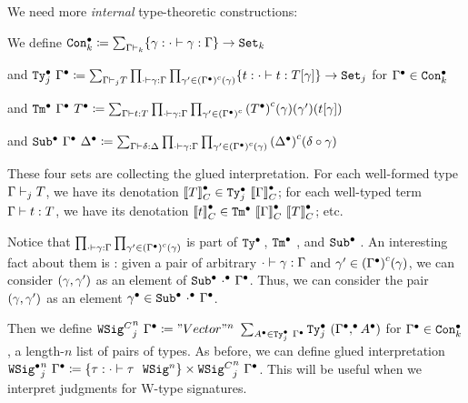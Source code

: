 \newcommand{\GTy}[2]{\ensuremath{\Glued{\texttt{Ty}}_{#1}~{#2}}}
\newcommand{\GCon}[1]{\ensuremath{\Glued{\texttt{Con}}_{#1}}}
\newcommand{\GTm}[2]{\ensuremath{\Glued{\texttt{Tm}}~{#1}~{#2}}}
\newcommand{\GSub}[2]{\ensuremath{\Glued{\texttt{Sub}}~{#1}~{#2}}}
\newcommand{\GMWSig}[3]{\ensuremath{{\texttt{WSig}^C}_{#1}^{#3}~{#2}}}
\newcommand{\GWSig}[3]{\ensuremath{{\Glued{\texttt{WSig}}}_{#1}^{#3}~{#2}}}


We need more \emph{internal} type-theoretic constructions:

We define $\GCon{k} \coloneq \sum_{\goodCtx{\Gm}{k}} \{\gm : \goodSub{\cdot}{\gm}{\Gm} \} \to \Set{k}$ 


and $\GTy{j}{\Glued{\Gm}} \coloneq \sum_{\goodType{\Gm}{T}{j}} \prod_{\goodSub{\cdot}{\gm}{\Gm}}\prod_{\gm' \in \Gmodel{\Glued{\Gm}}(\gm)}\{t : \goodTerm{\cdot}{t}{\sub{T}{\gm}}\}\to\Set{j} $ for $\Glued{\Gm} \in \GCon{k}$

and $\GTm{\Glued{\Gm}}{\Glued{T}} \coloneq \sum_{\goodTerm{\Gm}{t}{T}} \prod_{\goodSub{\cdot}{\gm}{\Gm}} \prod_{\gm' \in\Gmodel{\Glued{\Gm}}} \Gmodel{\Glued{T}}(\gm)(\gm')(\sub{t}{\gm})$

and $\GSub{\Glued{\Gm}}{\Glued{\Dl}} \coloneq \sum_{\goodSub{\Gm}{\delta}{\Dl}} \prod_{\goodSub{\cdot}{\gm}{\Gm}} \prod_{\gm' \in \Gmodel{\Glued{\Gm}}(\gm)} \Gmodel{\Glued{\Dl}}(\delta \circ \gm) $

These four sets are collecting the glued interpretation.
For each well-formed type $\goodType{\Gm}{T}{j}$, we have its denotation $\denotesCC{T} \in \GTy{j}{\denotesCC{\Gm}}$;
for each well-typed term $\goodTerm{\Gm}{t}{T}$, we have its denotation $\denotesCC{t} \in \GTm{\denotesCC{\Gm}}{\denotesCC{T}}$;
etc.


Notice that
$\prod_{\goodSub{\cdot}{\gm}{\Gm}} \prod_{\gm' \in \Gmodel{\Glued{\Gm}}(\gm)}$
is part of $\GTy{\!}{\!}$, $\GTm{\!}{\!}$, and $\GSub{\!}{\!}$.
An interesting fact about them is : given a pair of arbitrary $\goodSub{\cdot}{\gm}{\Gm}$
and $\gm' \in \Gmodel{\Glued{\Gm}}(\gm)$, we can consider $(\gm, \gm')$ as an
element of $\GSub{\Glued{\cdot}}{\Glued{\Gm}}$.
Thus, we can consider the pair $(\gm,
\gm')$ as an element $\Glued{\gm} \in \GSub{\Glued{\cdot}}{\Glued{\Gm}}$.


Then we define $\GMWSig{j}{\Glued{\Gm}}{n} \coloneq "Vector"^n~\sum_{\Glued{A}
\in \GTy{j}{\Glued{\Gm}}} \GTy{j}{(\GSubstExt{\Glued{\Gm}}{\Glued{A}})}$ for
$\Glued{\Gm} \in \GCon{k}$, a length-$n$ list of pairs of types.
As before, we can define glued interpretation $\GWSig{j}{\Glued{\Gm}}{n}
\coloneq \{ \wsig : \goodWSig{\cdot}{\wsig}{n} \} \times
\GMWSig{j}{\Glued{\Gm}}{n}$. This will be useful when we interpret judgments for
W-type signatures.


